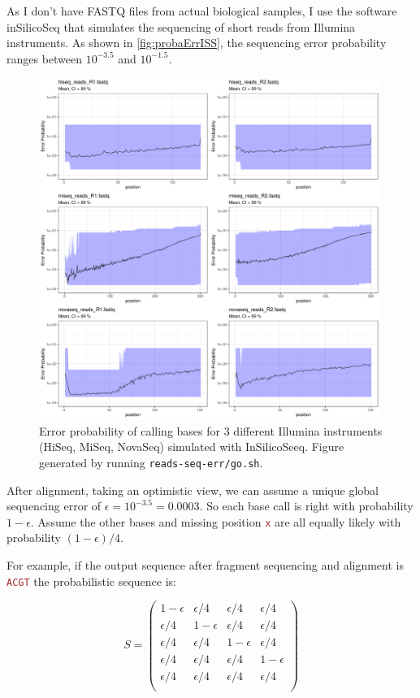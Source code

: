 \documentclass[12pt]{article}
\newcommand{\sq}[1]{\texttt{\textcolor{brown}{#1}}}
\begin{document}
As I don't have FASTQ files from actual biological samples, I use the software  \textsf{inSilicoSeq} that simulates the sequencing of short reads from Illumina instruments. 
As shown in \autoref{fig:probaErrISS}, the sequencing error probability ranges between $10^{-3.5}$ and  $10^{-1.5}$.  

\begin{figure}[H]
\begin{center}
 \includegraphics[width = 0.99\textwidth]{figs/plot-errorProba.pdf}
\caption{Error probability of calling bases for 3 different Illumina instruments (HiSeq, MiSeq, NovaSeq) simulated with \textsf{InSilicoSeeq}. Figure generated by running \texttt{reads-seq-err/go.sh}.}
\label{fig:probaErrISS}
\end{center}
\end{figure}

After alignment, taking an optimistic view, we can assume a unique global sequencing error of $\epsilon=10^{-3.5}=0.0003$.
So each base call is right with probability $1-\epsilon$. Assume the other bases and missing position \sq{x} are all equally likely with probability $(1-\epsilon)/4$. 

For example, if the output sequence after fragment sequencing and alignment is \sq{ACGT} the probabilistic sequence is:

$$
S = 
\begin{pmatrix}
1-\epsilon & \epsilon/4    & \epsilon/4  & \epsilon/4  \\
\epsilon/4 & 1-\epsilon & \epsilon/4  & \epsilon/4  \\
\epsilon/4 & \epsilon/4  & 1-\epsilon  & \epsilon/4 \\
\epsilon/4 & \epsilon/4  & \epsilon/4  & 1-\epsilon \\
\epsilon/4 & \epsilon/4  & \epsilon/4  & \epsilon/4 \\
\end{pmatrix}
$$
\end{document}

